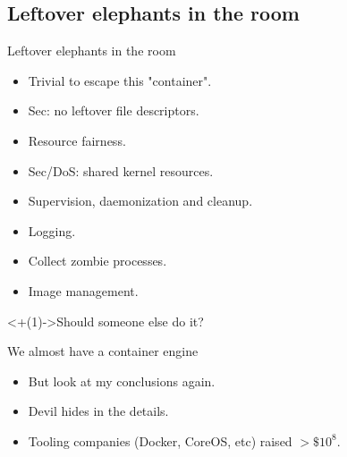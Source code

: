 \documentclass[14pt]{beamer}
\begin{document}
\subsection{Leftover elephants in the room}
\begin{frame}{Leftover elephants in the room}
    \begin{itemize}[<+(1)->]
        \item Trivial to escape this "container".
        \item Sec: no leftover file descriptors.
        \item Resource fairness.
        \item Sec/DoS: shared kernel resources.
        \item Supervision, daemonization and cleanup.
        \item Logging.
        \item Collect zombie processes.
        \item Image management.
    \end{itemize}
    \visible<+(1)->{Should someone else do it?}
\end{frame}

\begin{frame}{We almost have a container engine}
    \begin{itemize}[<+(1)->]
        \item But look at my conclusions again.
        \item Devil hides in the details.
        \item Tooling companies (Docker, CoreOS, etc) raised $>\$10^8$.
    \end{itemize}
\end{frame}
\end{document}

